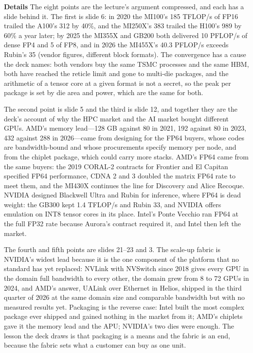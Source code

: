 \documentclass[11pt,letterpaper]{article}
\newcommand{\para}[1]{\medskip\noindent\textbf{#1}\quad}
\begin{document}
\para{Details} The eight points are the lecture's argument compressed, and each has a slide behind it. The first is slide 6: in 2020 the MI100's 185 TFLOP/s of FP16 trailed the A100's 312 by 40\%, and the MI250X's 383 trailed the H100's 989 by 60\% a year later; by 2025 the MI355X and GB200 both delivered 10 PFLOP/s of dense FP4 and 5 of FP8, and in 2026 the MI455X's 40.3 PFLOP/s exceeds Rubin's 35 (vendor figures, different block formats). The convergence has a cause the deck names: both vendors buy the same TSMC processes and the same HBM, both have reached the reticle limit and gone to multi-die packages, and the arithmetic of a tensor core at a given format is not a secret, so the peak per package is set by die area and power, which are the same for both.

The second point is slide 5 and the third is slide 12, and together they are the deck's account of why the HPC market and the AI market bought different GPUs. AMD's memory lead---128 GB against 80 in 2021, 192 against 80 in 2023, 432 against 288 in 2026---came from designing for the FP64 buyers, whose codes are bandwidth-bound and whose procurements specify memory per node, and from the chiplet package, which could carry more stacks. AMD's FP64 came from the same buyers: the 2019 CORAL-2 contracts for Frontier and El Capitan specified FP64 performance, CDNA 2 and 3 doubled the matrix FP64 rate to meet them, and the MI430X continues the line for Discovery and Alice Recoque. NVIDIA designed Blackwell Ultra and Rubin for inference, where FP64 is dead weight: the GB300 kept 1.4 TFLOP/s and Rubin 33, and NVIDIA offers emulation on INT8 tensor cores in its place. Intel's Ponte Vecchio ran FP64 at the full FP32 rate because Aurora's contract required it, and Intel then left the market.

The fourth and fifth points are slides 21--23 and 3. The scale-up fabric is NVIDIA's widest lead because it is the one component of the platform that no standard has yet replaced: NVLink with NVSwitch since 2018 gives every GPU in the domain full bandwidth to every other, the domain grew from 8 to 72 GPUs in 2024, and AMD's answer, UALink over Ethernet in Helios, shipped in the third quarter of 2026 at the same domain size and comparable bandwidth but with no measured results yet. Packaging is the reverse case: Intel built the most complex package ever shipped and gained nothing in the market from it; AMD's chiplets gave it the memory lead and the APU; NVIDIA's two dies were enough. The lesson the deck draws is that packaging is a means and the fabric is an end, because the fabric sets what a customer can buy as one unit.
\end{document}
